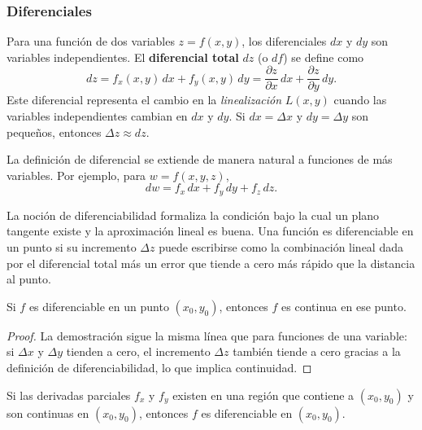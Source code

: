 \subsubsection{Diferenciales}

\begin{definition}
Para una función de dos variables $z = f(x, y)$, los diferenciales $dx$ y $dy$ son variables independientes. El \textbf{diferencial total} $dz$ (o $df$) se define como
\[
dz = f_x(x, y)\,dx + f_y(x, y)\,dy = \frac{\partial z}{\partial x}\,dx + \frac{\partial z}{\partial y}\,dy.
\]
Este diferencial representa el cambio en la \emph{linealización} $L(x,y)$ cuando las variables independientes cambian en $dx$ y $dy$. Si $dx = \Delta x$ y $dy = \Delta y$ son pequeños, entonces $\Delta z \approx dz$.
\end{definition}

\begin{rem}
La definición de diferencial se extiende de manera natural a funciones de más variables. Por ejemplo, para $w = f(x, y, z)$,
\[
dw = f_x \, dx + f_y \, dy + f_z \, dz.
\]
\end{rem}

\begin{rem}
La noción de diferenciabilidad formaliza la condición bajo la cual un plano tangente existe y la aproximación lineal es buena. Una función es diferenciable en un punto si su incremento $\Delta z$ puede escribirse como la combinación lineal dada por el diferencial total más un error que tiende a cero más rápido que la distancia al punto.
\end{rem}

\begin{theorem}
Si $f$ es diferenciable en un punto $(x_0, y_0)$, entonces $f$ es continua en ese punto.
\end{theorem}
\begin{proof}
La demostración sigue la misma línea que para funciones de una variable: si $\Delta x$ y $\Delta y$ tienden a cero, el incremento $\Delta z$ también tiende a cero gracias a la definición de diferenciabilidad, lo que implica continuidad.
\end{proof}

\begin{theorem}
Si las derivadas parciales $f_x$ y $f_y$ existen en una región que contiene a $(x_0, y_0)$ y son continuas en $(x_0, y_0)$, entonces $f$ es diferenciable en $(x_0, y_0)$.
\end{theorem}

